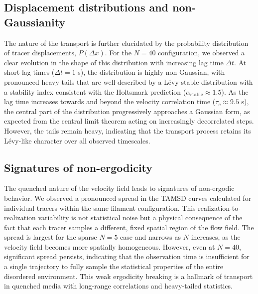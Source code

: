 \documentclass[]{article}
\begin{document}
\subsection{Displacement distributions and non-Gaussianity}

The nature of the transport is further elucidated by the probability distribution of tracer displacements, $P(\Delta x)$. For the $N=40$ configuration, we observed a clear evolution in the shape of this distribution with increasing lag time $\Delta t$. At short lag times ($\Delta t = 1$ s), the distribution is highly non-Gaussian, with pronounced heavy tails that are well-described by a L\'evy-stable distribution with a stability index consistent with the Holtsmark prediction ($\alpha_{\text{stable}} \approx 1.5$). As the lag time increases towards and beyond the velocity correlation time ($\tau_c \approx 9.5$ s), the central part of the distribution progressively approaches a Gaussian form, as expected from the central limit theorem acting on increasingly decorrelated steps. However, the tails remain heavy, indicating that the transport process retains its L\'evy-like character over all observed timescales.

\subsection{Signatures of non-ergodicity}

The quenched nature of the velocity field leads to signatures of non-ergodic behavior. We observed a pronounced spread in the TAMSD curves calculated for individual tracers within the same filament configuration. This realization-to-realization variability is not statistical noise but a physical consequence of the fact that each tracer samples a different, fixed spatial region of the flow field. The spread is largest for the sparse $N=5$ case and narrows as $N$ increases, as the velocity field becomes more spatially homogeneous. However, even at $N=40$, significant spread persists, indicating that the observation time is insufficient for a single trajectory to fully sample the statistical properties of the entire disordered environment. This weak ergodicity breaking is a hallmark of transport in quenched media with long-range correlations and heavy-tailed statistics.
\end{document}
